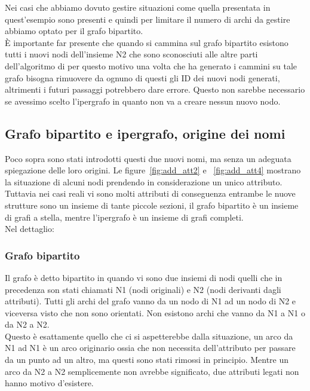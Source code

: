 Nei casi che abbiamo dovuto gestire situazioni come quella presentata in quest'esempio sono presenti e quindi per limitare il numero di archi da gestire abbiamo optato per il grafo bipartito.\\
È importante far presente che quando si cammina sul grafo bipartito esistono tutti i nuovi nodi dell'insieme N2 che sono sconosciuti alle altre parti dell'algoritmo di \cnrl per questo motivo una volta che \nv ha generato i cammini su tale grafo bisogna rimuovere da ognuno di questi gli ID dei nuovi nodi generati, altrimenti i futuri passaggi potrebbero dare errore. Questo non sarebbe necessario se avessimo scelto l'ipergrafo in quanto non va a creare nessun nuovo nodo.
%
\subsection{Grafo bipartito e ipergrafo, origine dei nomi}
Poco sopra sono stati introdotti questi due nuovi nomi, ma senza un adeguata spiegazione delle loro origini. Le figure~\ref{fig:add_att2} e ~\ref{fig:add_att4} mostrano la situazione di alcuni nodi prendendo in considerazione un unico attributo. Tuttavia nei casi reali vi sono molti attributi di conseguenza entrambe le nuove strutture sono un insieme di tante piccole sezioni, il grafo bipartito è un insieme di grafi a stella, mentre l'ipergrafo è un insieme di grafi completi.\\
Nel dettaglio:
%
\subsubsection*{Grafo bipartito}
Il grafo è detto bipartito in quando vi sono due insiemi di nodi quelli che in precedenza son stati chiamati N1 (nodi originali) e N2 (nodi derivanti dagli attributi). Tutti gli archi del grafo vanno da un nodo di N1 ad un nodo di N2 e viceversa visto che non sono orientati. Non esistono archi che vanno da N1 a N1 o da N2 a N2.\\
Questo è esattamente quello che ci si aspetterebbe dalla situazione, un arco da N1 ad N1 è un arco originario ossia che non necessita dell'attributo per passare da un punto ad un altro, ma questi sono stati rimossi in principio. Mentre un arco da N2 a N2 semplicemente non avrebbe significato, due attributi legati non hanno motivo d'esistere.
%
